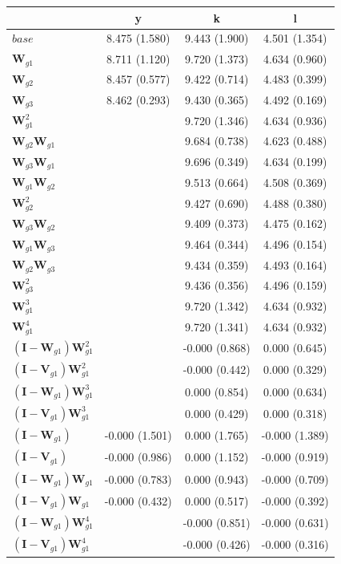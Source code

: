 \begin{tabular}{lccc}
	\toprule\toprule
	~ & y & k & l \\[0.8em]
	\midrule
	$base$ & 8.475
(1.580) & 9.443
(1.900) & 4.501
(1.354) \\[0.9em]
	$\mathbf{W}_{g1}$ & 8.711
(1.120) & 9.720
(1.373) & 4.634
(0.960) \\[0.9em]
	$\mathbf{W}_{g2}$ & 8.457
(0.577) & 9.422
(0.714) & 4.483
(0.399) \\[0.9em]
	$\mathbf{W}_{g3}$ & 8.462
(0.293) & 9.430
(0.365) & 4.492
(0.169) \\[0.9em]
	$\mathbf{W}^{2}_{g1}$ & ~ & 9.720
(1.346) & 4.634
(0.936) \\[0.9em]
	$\mathbf{W}_{g2}\mathbf{W}_{g1}$ & ~ & 9.684
(0.738) & 4.623
(0.488) \\[0.9em]
	$\mathbf{W}_{g3}\mathbf{W}_{g1}$ & ~ & 9.696
(0.349) & 4.634
(0.199) \\[0.9em]
	$\mathbf{W}_{g1}\mathbf{W}_{g2}$ & ~ & 9.513
(0.664) & 4.508
(0.369) \\[0.9em]
	$\mathbf{W}^{2}_{g2}$ & ~ & 9.427
(0.690) & 4.488
(0.380) \\[0.9em]
	$\mathbf{W}_{g3}\mathbf{W}_{g2}$ & ~ & 9.409
(0.373) & 4.475
(0.162) \\[0.9em]
	$\mathbf{W}_{g1}\mathbf{W}_{g3}$ & ~ & 9.464
(0.344) & 4.496
(0.154) \\[0.9em]
	$\mathbf{W}_{g2}\mathbf{W}_{g3}$ & ~ & 9.434
(0.359) & 4.493
(0.164) \\[0.9em]
	$\mathbf{W}^{2}_{g3}$ & ~ & 9.436
(0.356) & 4.496
(0.159) \\[0.9em]
	$\mathbf{W}^{3}_{g1}$ & ~ & 9.720
(1.342) & 4.634
(0.932) \\[0.9em]
	$\mathbf{W}^{4}_{g1}$ & ~ & 9.720
(1.341) & 4.634
(0.932) \\[0.9em]
	$(\mathbf{I} - \mathbf{W}_{g1})\mathbf{W}^{2}_{g1}$ & ~ & -0.000
(0.868) & 0.000
(0.645) \\[0.9em]
	$(\mathbf{I} - \mathbf{V}_{g1})\mathbf{W}^{2}_{g1}$ & ~ & -0.000
(0.442) & 0.000
(0.329) \\[0.9em]
	$(\mathbf{I} - \mathbf{W}_{g1})\mathbf{W}^{3}_{g1}$ & ~ & 0.000
(0.854) & 0.000
(0.634) \\[0.9em]
	$(\mathbf{I} - \mathbf{V}_{g1})\mathbf{W}^{3}_{g1}$ & ~ & 0.000
(0.429) & 0.000
(0.318) \\[0.9em]
	$(\mathbf{I} - \mathbf{W}_{g1})$ & -0.000
(1.501) & 0.000
(1.765) & -0.000
(1.389) \\[0.9em]
	$(\mathbf{I} - \mathbf{V}_{g1})$ & -0.000
(0.986) & 0.000
(1.152) & -0.000
(0.919) \\[0.9em]
	$(\mathbf{I} - \mathbf{W}_{g1})\mathbf{W}_{g1}$ & -0.000
(0.783) & 0.000
(0.943) & -0.000
(0.709) \\[0.9em]
	$(\mathbf{I} - \mathbf{V}_{g1})\mathbf{W}_{g1}$ & -0.000
(0.432) & 0.000
(0.517) & -0.000
(0.392) \\[0.9em]
	$(\mathbf{I} - \mathbf{W}_{g1})\mathbf{W}^{4}_{g1}$ & ~ & -0.000
(0.851) & -0.000
(0.631) \\[0.9em]
	$(\mathbf{I} - \mathbf{V}_{g1})\mathbf{W}^{4}_{g1}$ & ~ & -0.000
(0.426) & -0.000
(0.316) \\[0.9em]
	\bottomrule
\end{tabular}